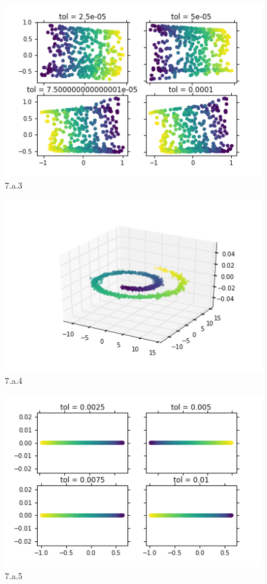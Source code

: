 \documentclass[a4paper,11pt]{article}
\begin{document}
\begin{figure}[H]
  \includegraphics[width=\linewidth]{7_a_3.png}
  \caption{7.a.3}\label{fig:7_3}
\end{figure}
\begin{figure}[H]
  \includegraphics[width=\linewidth]{7_a_4.png}
  \caption{7.a.4}\label{fig:7_4}
\end{figure}
\begin{figure}[H]
  \includegraphics[width=\linewidth]{7_a_5.png}
  \caption{7.a.5}\label{fig:7_5}
\end{figure}
\end{document}
